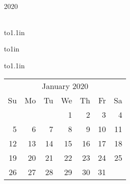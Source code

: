 \documentclass[12pt]{article}
\newlength{\cellwidth}
\newlength{\cellheight}
\begin{document}
% 
\pagestyle{empty}%
\setlength{\cellwidth}{18cm}%
\setlength{\cellwidth}{0.157143\cellwidth}
\setlength{\cellheight}{24cm}%
\setlength{\cellheight}{1.000000\cellheight}
\ \par{}%
\vspace*{-3cm}%
\vspace*{-3.1cm}%
\vfill%
\begin{center}%
{\Huge 2020}%
\end{center}%
\vspace*{1cm}%
\begin{center}%
\parbox[l]{4.3in}{%

\noindent\\%
\def\month{\hbox to1.1in{%
\vbox to1in{%
\vfil  \hbox to1.1in{%
\hfil\scriptsize\begin{tabular}{@{\hspace{0mm}}r@{\hspace{1mm}}r@{\hspace{1mm}}r@{\hspace{1mm}}r@{\hspace{1mm}}r@{\hspace{1mm}}r@{\hspace{1mm}}r@{\hspace{0mm}}}%
\multicolumn{7}{c}{January 2020}\\[1mm]
Su & Mo & Tu & We & Th & Fr & Sa\\[0.7mm]
 &  &  & 1 & 2 & 3 & 4\\[0.5mm]
5 & 6 & 7 & 8 & 9 & 10 & 11\\[0.5mm]
12 & 13 & 14 & 15 & 16 & 17 & 18\\[0.5mm]
19 & 20 & 21 & 22 & 23 & 24 & 25\\[0.5mm]
26 & 27 & 28 & 29 & 30 & 31 & 
\end{tabular}\hfil}\vfil}}}%
\month\hspace*{0.5in}%
\def\month{\hbox to1.1in{%
\vbox to1in{%
\vfil  \hbox to1.1in{%
\hfil\scriptsize\begin{tabular}{@{\hspace{0mm}}r@{\hspace{1mm}}r@{\hspace{1mm}}r@{\hspace{1mm}}r@{\hspace{1mm}}r@{\hspace{1mm}}r@{\hspace{1mm}}r@{\hspace{0mm}}}%
\multicolumn{7}{c}{February 2020}\\[1mm]
Su & Mo & Tu & We & Th & Fr & Sa\\[0.7mm]

\end{tabular}}}}}}
\end{center}
\end{document}
